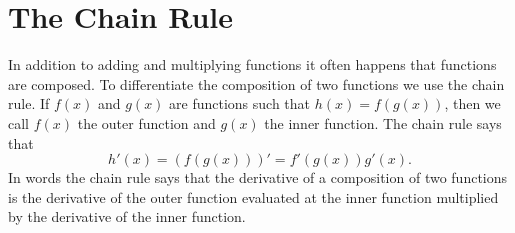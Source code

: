 \documentclass[main.tex]{subfiles}
\begin{document}
\section{The Chain Rule}
In addition to adding and multiplying functions it often happens that functions are composed. To differentiate the composition of two functions we use the chain rule. If $f(x)$ and $g(x)$ are functions such that $h(x) = f(g(x))$, then we call $f(x)$ the outer function and $g(x)$ the inner function. The chain rule says that
\begin{equation}
h'(x) = \left( f \left( g(x) \right) \right)' = f' \left(g(x) \right) g'(x).
\end{equation}
In words the chain rule says that the derivative of a composition of two functions is the derivative of the outer function evaluated at the inner function multiplied by the derivative of the inner function.
\end{document}
